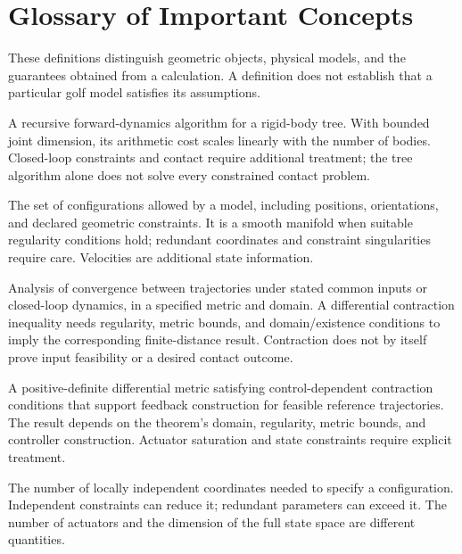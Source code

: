 \chapter{Glossary of Important Concepts}

These definitions distinguish geometric objects, physical models, and the guarantees obtained from a calculation. A definition does not establish that a particular golf model satisfies its assumptions.

\begin{description}[style=nextline,leftmargin=0pt,font=\bfseries,itemsep=0.5em]
\item[Articulated Body Algorithm]
A recursive forward-dynamics algorithm for a rigid-body tree. With bounded joint dimension, its arithmetic cost scales linearly with the number of bodies. Closed-loop constraints and contact require additional treatment; the tree algorithm alone does not solve every constrained contact problem.

\item[Configuration Space]
The set of configurations allowed by a model, including positions, orientations, and declared geometric constraints. It is a smooth manifold when suitable regularity conditions hold; redundant coordinates and constraint singularities require care. Velocities are additional state information.

\item[Contraction Analysis]
Analysis of convergence between trajectories under stated common inputs or closed-loop dynamics, in a specified metric and domain. A differential contraction inequality needs regularity, metric bounds, and domain/existence conditions to imply the corresponding finite-distance result. Contraction does not by itself prove input feasibility or a desired contact outcome.

\item[Control Contraction Metric (CCM)]
A positive-definite differential metric satisfying control-dependent contraction conditions that support feedback construction for feasible reference trajectories. The result depends on the theorem's domain, regularity, metric bounds, and controller construction. Actuator saturation and state constraints require explicit treatment.

\item[Degrees of Freedom (DOF)]
The number of locally independent coordinates needed to specify a configuration. Independent constraints can reduce it; redundant parameters can exceed it. The number of actuators and the dimension of the full state space are different quantities.


\end{description}
